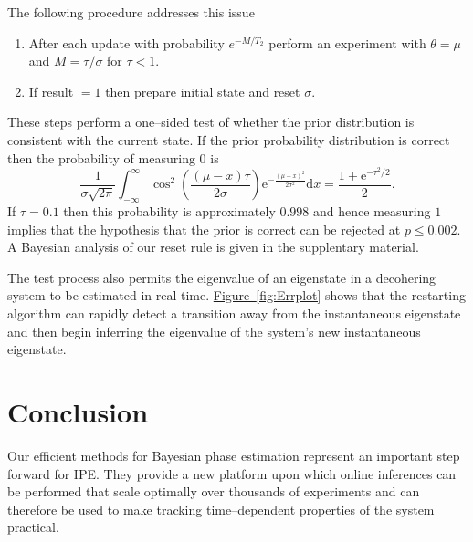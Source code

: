 \documentclass[aps,pra,amsmath,twocolumn,amssymb,superscriptaddress]{revtex4-1}
\newcommand{\app}[1]{the supplentary material}
\newcommand{\fig}[1]{\hyperref[fig:#1]{Figure~\ref*{fig:#1}}}
\newcommand{\ee}{\mathrm{e}}
\begin{document}
{The following procedure addresses this issue%
\begin{enumerate}
\item After each update with probability $e^{-M/T_2}$ perform an experiment with $\theta=\mu$ and $M=\tau/\sigma$ for $\tau< 1$.
\item If result $=1$ then prepare initial state and reset $\sigma$.
\end{enumerate}

These steps perform a one--sided test of whether the prior distribution is consistent with the current state.
If the prior probability distribution is correct then the probability of measuring $0$ is
\begin{equation}
    \frac{1}{\sigma\sqrt{2\pi}}\int_{-\infty}^\infty \cos^2\left(\frac{(\mu-x)\tau}{2\sigma}\right)\ee^{-\frac{(\mu-x)^2}{2\sigma^2}} \mathrm{d}x = \frac{1+\ee^{-\tau^2/2}}{2}.
\end{equation}
If $\tau=0.1$ then this probability is approximately $0.998$ and hence measuring $1$ implies that the hypothesis that the prior is correct can be rejected at $p \le 0.002$. A Bayesian analysis of our reset rule
is given in \app{bf}.


The test process also permits the eigenvalue of an eigenstate in a decohering system to be estimated in real time. \fig{Errplot} shows that the restarting algorithm can rapidly detect a transition away from the instantaneous eigenstate and then begin inferring the eigenvalue of the system's new instantaneous eigenstate.  

\section{Conclusion}


Our efficient methods for Bayesian phase estimation represent an important step forward for IPE.  They provide
a new platform upon which online inferences can be performed that scale optimally over
thousands of experiments and can therefore be used to make tracking time--dependent properties of the system
practical.  

}
\end{document}
